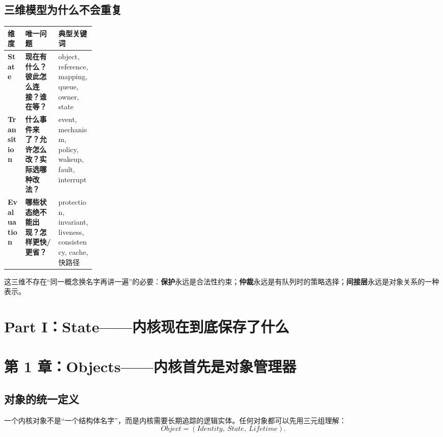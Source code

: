 \documentclass[11pt,a4paper]{ctexart}
\newcommand{\kw}[1]{\textbf{#1}}
\begin{document}
\subsection{三维模型为什么不会重复}
\begin{center}
\small
\begin{tabularx}{\linewidth}{>{\bfseries}p{0.20\linewidth} X X}
\toprule
维度 & 唯一问题 & 典型关键词 \\
\midrule
State & \kw{现在有什么？彼此怎么连接？谁在等？} & object, reference, mapping, queue, owner, state \\
Transition & \kw{什么事件来了？允许怎么改？实际选哪种改法？} & event, mechanism, policy, wakeup, fault, interrupt \\
Evaluation & \kw{哪些状态绝不能出现？怎样更快/更省？} & protection, invariant, liveness, consistency, cache, 快路径 \\
\bottomrule
\end{tabularx}
\end{center}

这三维不存在“同一概念换名字再讲一遍”的必要：\kw{保护}永远是合法性约束；\kw{仲裁}永远是有队列时的策略选择；\kw{间接层}永远是对象关系的一种表示。

\newpage
\section{Part I：State——内核现在到底保存了什么}

\section{第 1 章：Objects——内核首先是对象管理器}

\subsection{对象的统一定义}
一个内核对象不是“一个结构体名字”，而是内核需要长期追踪的逻辑实体。任何对象都可以先用三元组理解：
\[
\boxed{Object=(Identity,\ State,\ Lifetime)}.
\]
\end{document}
